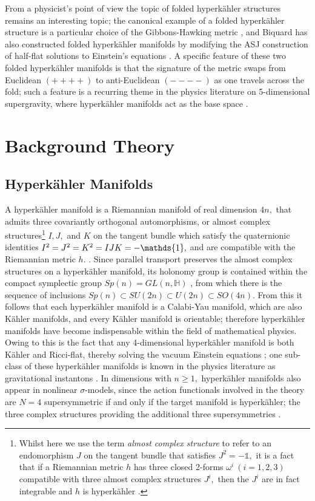 \documentclass[a4paper,12pt, onecolumn, notitlepage]{article}
\theoremstyle{definition}
\theoremstyle{remark}
\newcommand{\w}{\omega}
\newcommand{\K}{K\"ahler }
\newcommand{\HK}{hyperk\"ahler }
\begin{document}
From a physicist's point of view the topic of folded \HK structures remains an interesting topic; the canonical example of a folded \HK structure is a particular choice of the Gibbons-Hawking metric \cite{hitchin_2015}, and Biquard \cite{biquard_2015} has also constructed folded \HK manifolds by modifying the ASJ construction of half-flat solutions to Einstein's equations \cite{ashtekar_1988}. A specific feature of these two folded \HK manifolds is that the signature of the metric swaps from Euclidean $(++++)$ to anti-Euclidean $(----)$ as one travels across the fold; such a feature is a recurring theme in the physics literature on 5-dimensional supergravity, where \HK manifolds act as the base space \cite{gibbons_2013}.


\section{Background Theory}
\subsection{Hyperk\"ahler Manifolds}

A \HK manifold is a Riemannian manifold of real dimension $4n,$ that admits three covariantly orthogonal automorphisms, or almost complex structures\footnote{Whilst here we use the term \emph{almost complex structure} to refer to an endomorphism $J$ on the tangent bundle that satisfies $J^{2}=-\mathds{1},$ it is a fact that if a Riemannian metric $h$ has three closed 2-forms $\w^{i}\ (i=1,2,3)$ compatible with three almost complex structures $J^{i},$ then the $J^{i}$ are in fact integrable and $h$ is \HK \cite{hitchin_1987}.} $I,J,$ and $K$ on the tangent bundle which satisfy the quaternionic identities $I\indices{^2}=J\indices{^2}=K\indices{^2}=IJK=-\mathds{1},$ and are compatible with the Riemannian metric $h.$ \cite{hitchin_1991}. Since parallel transport preserves the almost complex structures on a \HK manifold, its holonomy group is contained within the compact symplectic group $Sp(n) = GL(n,\mathbb{H})$ \cite{dancer_1994}, from which there is the sequence of inclusions $Sp(n)\subset SU(2n)\subset U(2n) \subset SO(4n).$ From this it follows that each \HK manifold is a Calabi-Yau manifold, which are also \K manifolds, and every \K manifold is orientable; therefore \HK manifolds have become indispensable within the field of mathematical physics. Owing to this is the fact that any 4-dimensional \HK manifold is both \K and Ricci-flat, thereby solving the vacuum Einstein equations \cite{hitchin_1991}; one sub-class of these \HK manifolds is known in the physics literature as gravitational instantons \cite{dancer_1994, eguchi_1978, gibbons_1978}.
In dimensions with $n\geq1,$ \HK manifolds also appear in nonlinear $\sigma$-models, since the action functionals involved in the theory are $N=4$ supersymmetric if and only if the target manifold is hyperk\"ahler; the three complex structures providing the additional three supersymmetries \cite{hitchin_1987}.
\end{document}
